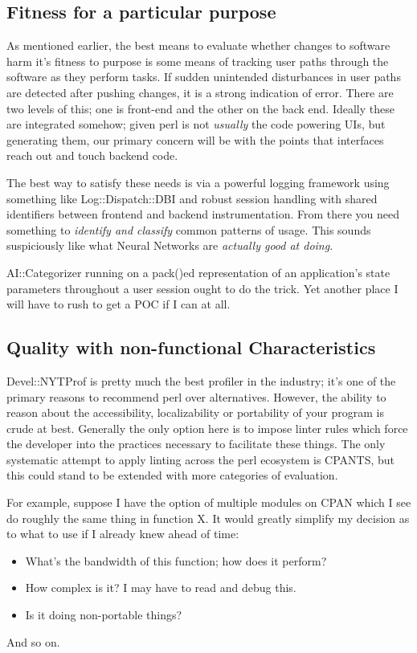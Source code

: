 \documentclass{article}
\begin{document}
\subsection{Fitness for a particular purpose}

As mentioned earlier, the best means to evaluate whether changes to software harm it's fitness to purpose is some means of tracking user paths through the software as they perform tasks.
If sudden unintended disturbances in user paths are detected after pushing changes, it is a strong indication of error.
There are two levels of this; one is front-end and the other on the back end.
Ideally these are integrated somehow; given perl is not \textit{usually} the code powering UIs, but generating them, our primary concern will be with the points that interfaces reach out and touch backend code.

The best way to satisfy these needs is via a powerful logging framework using something like Log::Dispatch::DBI and robust session handling with shared identifiers between frontend and backend instrumentation.
From there you need something to \textit{identify and classify} common patterns of usage.
This sounds suspiciously like what Neural Networks are \textit{actually good at doing}.

AI::Categorizer running on a pack()ed representation of an application's state parameters throughout a user session ought to do the trick.
Yet another place I will have to rush to get a POC if I can at all.

\subsection{Quality with non-functional Characteristics}

Devel::NYTProf is pretty much the best profiler in the industry; it's one of the primary reasons to recommend perl over alternatives.
However, the ability to reason about the accessibility, localizability or portability of your program is crude at best.
Generally the only option here is to impose linter rules which force the developer into the practices necessary to facilitate these things.
The only systematic attempt to apply linting across the perl ecosystem is CPANTS, but this could stand to be extended with more categories of evaluation.

For example, suppose I have the option of multiple modules on CPAN which I see do roughly the same thing in function X.
It would greatly simplify my decision as to what to use if I already knew ahead of time:
\begin{itemize}
\item What's the bandwidth of this function; how does it perform?
\item How complex is it?  I may have to read and debug this.
\item Is it doing non-portable things?
\end{itemize}
And so on.
\end{document}
